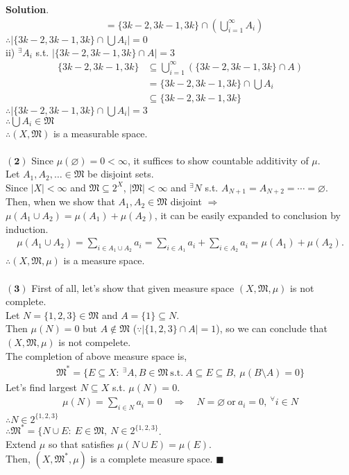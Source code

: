\documentclass[12pt]{article}
\renewcommand{\v}[1]{\ensuremath{\mathbf{#1}}} %
\renewcommand{\=}[1]{\stackrel{#1}{=}} %
\providecommand{\MM}{\mathfrak{M}}
\providecommand{\seq}{\subseteq}
\theoremstyle{definition}
\newenvironment{s}{%
        \begin{trivlist} \item \textbf{Solution}. }{%
            \hspace*{\fill} $\blacksquare$\end{trivlist}}%
\begin{document}
{\begin{s}
\begin{align*}
&=\{3k-2,3k-1,3k\}\cap \left(\bigcup_{i=1}^\infty A_i\right)
\end{align*}
\indent\indent $\therefore\left|\{3k-2,3k-1,3k\}\cap \bigcup A_i\right|=0$\\
\indent\indent ii) ${}^\exists A_i$ s.t. $|\{3k-2,3k-1,3k\}\cap A|=3$
\begin{align*}
\{3k-2,3k-1,3k\}&\subseteq \bigcup_{i=1}^\infty(\{3k-2,3k-1,3k\}\cap A)\\
&=\{3k-2,3k-1,3k\}\cap \bigcup A_i \\
&\subseteq \{3k-2,3k-1,3k\}
\end{align*}
\indent\indent $\therefore\left|\{3k-2,3k-1,3k\}\cap \bigcup A_i\right|=3$\\
\indent $\therefore \bigcup A_i\in\MM$\\
$\therefore (X,\MM)$ is a measurable space.\\ \\
\v{(2)} Since $\mu(\varnothing)=0<\infty$, it suffices to show countable additivity of $\mu$.\\
Let $A_1, A_2, \ldots \in \MM$ be disjoint sets.\\
Since $|X|<\infty$ and $\MM\subseteq 2^X$, $|\MM|<\infty$ and ${}^\exists N$ s.t. $A_{N+1} = A_{N+2} = \cdots=\varnothing$. Then, when we show that $A_1, A_2\in\MM$ disjoint $\Rightarrow$ $\mu(A_1\cup A_2)=\mu(A_1)+\mu(A_2)$, it can be easily expanded to conclusion by induction.
\begin{align*}
\mu(A_1 \cup A_2) = \sum_{i\in A_1\cup A_2} a_i = \sum_{i\in A_1} a_i + \sum_{i\in A_2} a_i = \mu(A_1) + \mu(A_2).
\end{align*}
$\therefore (X,\MM,\mu)$ is a measure space.\\
\\
\v{(3)} First of all, let's show that given measure space $(X,\MM,\mu)$ is not complete.\\
Let $N = \{1, 2, 3\}\in\MM$ and $A=\{1\}\subseteq N$.\\
Then $\mu(N)=0$ but $A\not\in\MM$ ($\because |\{1,2,3\}\cap A|=1$), so we can conclude that $(X,\MM,\mu)$ is not compelete.\\
The completion of above measure space is,
\begin{align*}
\MM^* =\{E\seq X:\ {}^\exists A, B\in\MM\ \mathrm{s.t.}\ A\seq E \seq B,\ \mu(B\setminus A)=0\}
\end{align*}
Let's find largest $N\seq X$ s.t. $\mu(N)=0$.
\begin{align*}
\mu(N) = \sum_{i\in N} a_i = 0\quad\Rightarrow\quad N=\varnothing\ \mathrm{or}\ a_i=0,\ {}^\forall i\in N
\end{align*}
$\therefore N\in 2^{\{1,2,3\}}$\\
$\therefore \MM^* = \{N\cup E:\ E\in\MM,\ N\in 2^{\{1,2,3\}}$.\\
Extend $\mu$ so that satisfies $\mu(N\cup E)=\mu(E)$.\\
Then, $(X, \MM^*, \mu)$ is a complete measure space.
\end{s}
\end{document}
